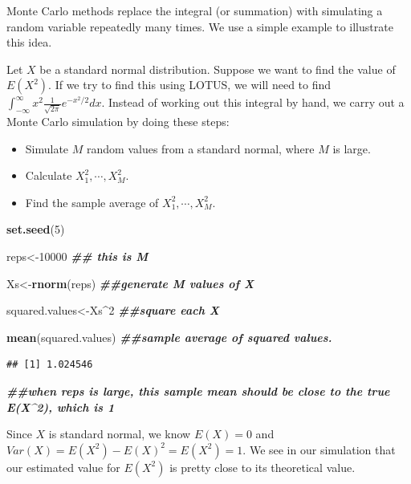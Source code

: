 \documentclass[
]{book}
\newenvironment{Shaded}{\begin{snugshade}}{\end{snugshade}}
\newcommand{\DecValTok}[1]{\textcolor[rgb]{0.00,0.00,0.81}{#1}}
\newcommand{\DocumentationTok}[1]{\textcolor[rgb]{0.56,0.35,0.01}{\textbf{\textit{#1}}}}
\newcommand{\FunctionTok}[1]{\textcolor[rgb]{0.13,0.29,0.53}{\textbf{#1}}}
\newcommand{\NormalTok}[1]{#1}
\newcommand{\OtherTok}[1]{\textcolor[rgb]{0.56,0.35,0.01}{#1}}
\newcommand{\SpecialCharTok}[1]{\textcolor[rgb]{0.81,0.36,0.00}{\textbf{#1}}}
\providecommand{\tightlist}{%
  \setlength{\itemsep}{0pt}\setlength{\parskip}{0pt}}
\begin{document}
Monte Carlo methods replace the integral (or summation) with simulating a random variable repeatedly many times. We use a simple example to illustrate this idea.

Let \(X\) be a standard normal distribution. Suppose we want to find the value of \(E(X^2)\). If we try to find this using LOTUS, we will need to find \(\int_{-\infty}^{\infty} x^2 \frac{1}{\sqrt{2 \pi}} e^{-x^2/2} dx\). Instead of working out this integral by hand, we carry out a Monte Carlo simulation by doing these steps:

\begin{itemize}
\tightlist
\item
  Simulate \(M\) random values from a standard normal, where \(M\) is large.
\item
  Calculate \(X_1^2, \cdots, X_M^2\).
\item
  Find the sample average of \(X_1^2, \cdots, X_M^2\).
\end{itemize}

\begin{Shaded}
\begin{Highlighting}[]
\FunctionTok{set.seed}\NormalTok{(}\DecValTok{5}\NormalTok{)}

\NormalTok{reps}\OtherTok{\textless{}{-}}\DecValTok{10000} \DocumentationTok{\#\# this is M}

\NormalTok{Xs}\OtherTok{\textless{}{-}}\FunctionTok{rnorm}\NormalTok{(reps) }\DocumentationTok{\#\#generate M values of X}

\NormalTok{squared.values}\OtherTok{\textless{}{-}}\NormalTok{Xs}\SpecialCharTok{\^{}}\DecValTok{2} \DocumentationTok{\#\#square each X}

\FunctionTok{mean}\NormalTok{(squared.values) }\DocumentationTok{\#\#sample average of squared values. }
\end{Highlighting}
\end{Shaded}

\begin{verbatim}
## [1] 1.024546
\end{verbatim}

\begin{Shaded}
\begin{Highlighting}[]
\DocumentationTok{\#\#when reps is large, this sample mean should be close to the true E(X\^{}2), which is 1}
\end{Highlighting}
\end{Shaded}

Since \(X\) is standard normal, we know \(E(X) = 0\) and \(Var(X) = E(X^2) - E(X)^2 = E(X^2) = 1\). We see in our simulation that our estimated value for \(E(X^2)\) is pretty close to its theoretical value.
\end{document}
